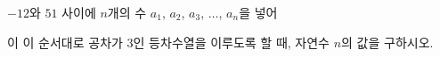 $-12$와 $51$ 사이에 $n$개의 수 $a_1$, $a_2$, $a_3$, $\ldots$, $a_n$을 넣어\par\smallskip{}\par\smallskip\noindent 이 이 순서대로 공차가 $3$인 등차수열을 이루도록 할 때, 자연수 $n$의 값을 구하시오.
